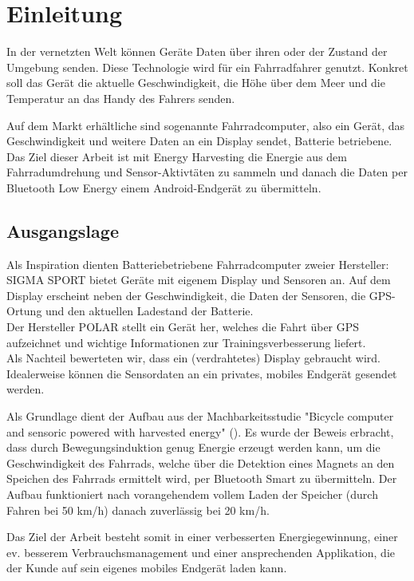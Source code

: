 \chapter{Einleitung}

In der vernetzten Welt können Geräte Daten über ihren oder der Zustand der Umgebung senden. Diese Technologie wird für ein Fahrradfahrer genutzt. Konkret soll das Gerät die aktuelle Geschwindigkeit, die Höhe über dem Meer und die Temperatur an das Handy des Fahrers senden.

Auf dem Markt erhältliche sind sogenannte Fahrradcomputer, also ein Gerät, das Geschwindigkeit und weitere Daten an ein Display sendet, Batterie betriebene. Das Ziel dieser Arbeit ist mit Energy Harvesting die Energie aus dem Fahrradumdrehung und Sensor-Aktivtäten zu sammeln und danach die Daten per Bluetooth Low Energy einem Android-Endgerät zu übermitteln.


\section{Ausgangslage}

Als Inspiration dienten Batteriebetriebene Fahrradcomputer zweier Hersteller:
SIGMA SPORT bietet Geräte mit eigenem Display und  Sensoren an. Auf dem Display erscheint neben der Geschwindigkeit, die Daten der Sensoren, die GPS-Ortung und den aktuellen Ladestand der Batterie.\\
Der Hersteller POLAR stellt ein Gerät her, welches die Fahrt über GPS aufzeichnet und wichtige Informationen zur Trainingsverbesserung liefert.\\
Als Nachteil bewerteten wir, dass ein (verdrahtetes) Display gebraucht wird. Idealerweise können die Sensordaten an ein privates, mobiles Endgerät gesendet werden.


Als Grundlage dient der Aufbau aus der Machbarkeitsstudie "Bicycle computer and sensoric powered with harvested energy" (\cite{PA_bicycle}). Es wurde der Beweis erbracht, dass durch Bewegungsinduktion genug Energie erzeugt werden kann, um die Geschwindigkeit des Fahrrads, welche über die Detektion eines Magnets an den Speichen des Fahrrads ermittelt wird, per Bluetooth Smart zu übermitteln. Der Aufbau funktioniert nach vorangehendem vollem Laden der Speicher (durch Fahren bei 50 km/h) danach zuverlässig bei 20 km/h.


Das Ziel der Arbeit besteht somit in einer verbesserten Energiegewinnung, einer ev. besserem Verbrauchsmanagement und einer ansprechenden Applikation, die der Kunde auf sein eigenes mobiles Endgerät laden kann.

